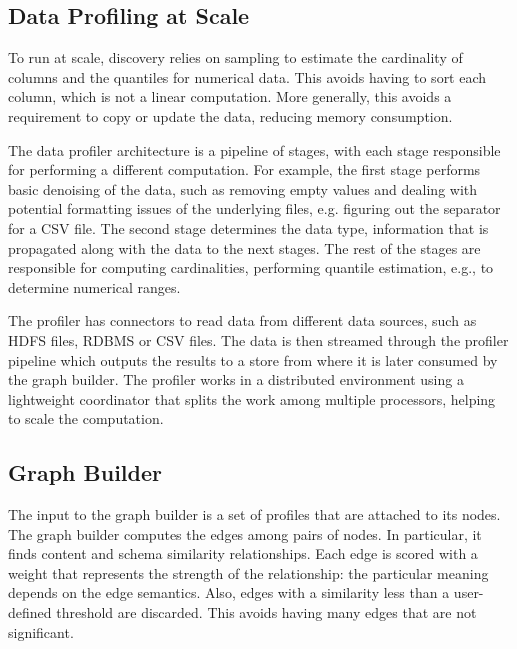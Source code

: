 \subsection{Data Profiling at Scale}

To run at scale, discovery relies on sampling to estimate the cardinality of columns and the quantiles for numerical data. This avoids having to sort each column, which is not a linear computation.  More generally, this avoids a requirement to copy or update the data, reducing memory consumption. 

The data profiler architecture is a pipeline of stages, with each stage responsible for performing a different computation. For example, the first stage performs basic denoising of the data, such as removing empty values and dealing with potential formatting issues of the underlying files, e.g. figuring out the separator for a CSV file. 
The second stage determines the data type, information that is propagated along with the data to the next stages. The rest of the stages are responsible for computing cardinalities, performing quantile estimation, e.g., to determine numerical ranges. 

The profiler has connectors to read data from different data sources, such as HDFS files, RDBMS or CSV files. The data is then streamed through the profiler pipeline 
which outputs the results 
to a store from where it is later consumed by the graph builder. 
The profiler works in a distributed environment using a lightweight coordinator that splits the work among multiple processors, helping to scale the computation.



\subsection{Graph Builder} 



The input to the graph builder is a set of profiles that are attached to its nodes. The graph builder computes the edges among pairs of nodes. In particular, it finds content and schema similarity relationships. Each edge is scored with a weight that represents the strength of the relationship: the particular meaning depends on the edge semantics.  Also, edges with a similarity less than a user-defined threshold are discarded.
This avoids having many edges that are not significant. 


